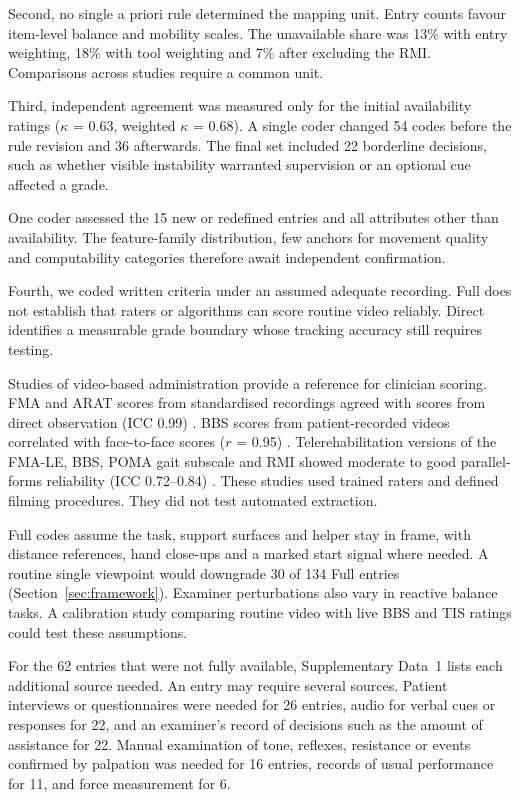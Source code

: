 \documentclass[11pt]{article}
\begin{document}
Second, no single a priori rule determined the mapping unit. Entry counts favour item-level balance and mobility scales. The unavailable share was 13\% with entry weighting, 18\% with tool weighting and 7\% after excluding the RMI. Comparisons across studies require a common unit.

Third, independent agreement was measured only for the initial availability ratings ($\kappa$ = 0.63, weighted $\kappa$ = 0.68). A single coder changed 54 codes before the rule revision and 36 afterwards. The final set included 22 borderline decisions, such as whether visible instability warranted supervision or an optional cue affected a grade.

One coder assessed the 15 new or redefined entries and all attributes other than availability. The feature-family distribution, few anchors for movement quality and computability categories therefore await independent confirmation.

Fourth, we coded written criteria under an assumed adequate recording. Full does not establish that raters or algorithms can score routine video reliably. Direct identifies a measurable grade boundary whose tracking accuracy still requires testing.

Studies of video-based administration provide a reference for clinician scoring. FMA and ARAT scores from standardised recordings agreed with scores from direct observation (ICC 0.99) \cite{Amano2018RemoteFMAARAT}. BBS scores from patient-recorded videos correlated with face-to-face scores ($r$ = 0.95) \cite{Onal2025TeleBBS}. Telerehabilitation versions of the FMA-LE, BBS, POMA gait subscale and RMI showed moderate to good parallel-forms reliability (ICC 0.72--0.84) \cite{Zhang2024TeleMobilityScales}. These studies used trained raters and defined filming procedures. They did not test automated extraction.

Full codes assume the task, support surfaces and helper stay in frame, with distance references, hand close-ups and a marked start signal where needed. A routine single viewpoint would downgrade 30 of 134 Full entries (Section~\ref{sec:framework}). Examiner perturbations also vary in reactive balance tasks. A calibration study comparing routine video with live BBS and TIS ratings could test these assumptions.

For the 62 entries that were not fully available, Supplementary Data~1 lists each additional source needed. An entry may require several sources. Patient interviews or questionnaires were needed for 26 entries, audio for verbal cues or responses for 22, and an examiner's record of decisions such as the amount of assistance for 22. Manual examination of tone, reflexes, resistance or events confirmed by palpation was needed for 16 entries, records of usual performance for 11, and force measurement for 6.
\end{document}

